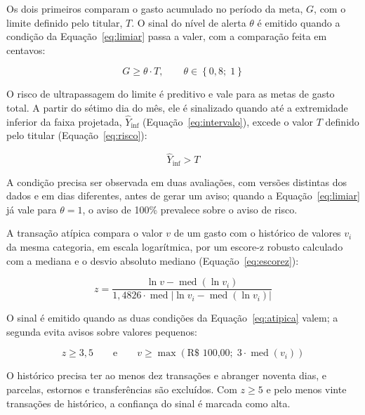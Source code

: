 Os dois primeiros comparam o gasto acumulado no período da meta, $G$, com o limite definido pelo titular, $T$. O sinal do nível de alerta $\theta$ é emitido quando a condição da Equação~\ref{eq:limiar} passa a valer, com a comparação feita em centavos:

\begin{equation}
G \ge \theta \cdot T, \qquad \theta \in \left\{0{,}8;\; 1\right\}
\label{eq:limiar}
\end{equation}

O risco de ultrapassagem do limite é preditivo e vale para as metas de gasto total. A partir do sétimo dia do mês, ele é sinalizado quando até a extremidade inferior da faixa projetada, $\hat{Y}_{\mathrm{inf}}$ (Equação~\ref{eq:intervalo}), excede o valor $T$ definido pelo titular (Equação~\ref{eq:risco}):

\begin{equation}
\hat{Y}_{\mathrm{inf}} > T
\label{eq:risco}
\end{equation}

\noindent A condição precisa ser observada em duas avaliações, com versões distintas dos dados e em dias diferentes, antes de gerar um aviso; quando a Equação~\ref{eq:limiar} já vale para $\theta = 1$, o aviso de 100\% prevalece sobre o aviso de risco.

A transação atípica compara o valor $v$ de um gasto com o histórico de valores $v_i$ da mesma categoria, em escala logarítmica, por um escore-z robusto calculado com a mediana e o desvio absoluto mediano (Equação~\ref{eq:escorez}):

\begin{equation}
z = \frac{\ln v - \operatorname{med}\left(\ln v_i\right)}{1{,}4826 \cdot \operatorname{med}\left| \ln v_i - \operatorname{med}\left(\ln v_i\right) \right|}
\label{eq:escorez}
\end{equation}

\noindent O sinal é emitido quando as duas condições da Equação~\ref{eq:atipica} valem; a segunda evita avisos sobre valores pequenos:

\begin{equation}
z \ge 3{,}5
\qquad \text{e} \qquad
v \ge \max\left(\text{R\$~100,00};\; 3 \cdot \operatorname{med}\left(v_i\right)\right)
\label{eq:atipica}
\end{equation}

\noindent O histórico precisa ter ao menos dez transações e abranger noventa dias, e parcelas, estornos e transferências são excluídos. Com $z \ge 5$ e pelo menos vinte transações de histórico, a confiança do sinal é marcada como alta.

